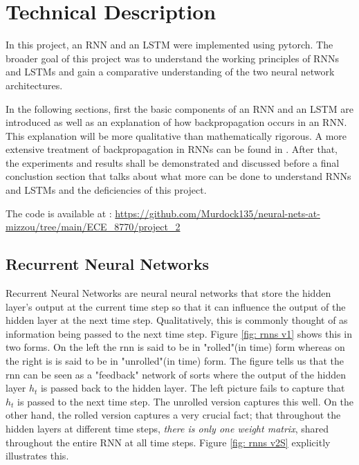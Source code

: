 \documentclass[12pt, letterpaper]{article}
\begin{document}

\tableofcontents

\section{Technical Description}

In this project, an RNN and an LSTM were implemented using pytorch.
The broader goal of this project was to understand the working principles of
RNNs and LSTMs and gain a comparative understanding of the two neural network
architectures. 

In the following sections, first the basic components of an RNN and an LSTM 
are introduced as well as an explanation of how backpropagation occurs in an 
RNN. This explanation will be more qualitative than mathematically rigorous. 
A more extensive treatment of backpropagation in RNNs can be found in \cite{zhang2023dive}. After that, the experiments and results shall be demonstrated and discussed before
a final conclustion section that talks about what more can be done to understand
RNNs and LSTMs and the deficiencies of this project.

The code is available at : \url{https://github.com/Murdock135/neural-nets-at-mizzou/tree/main/ECE_8770/project_2}

\subsection{Recurrent Neural Networks}

Recurrent Neural Networks are neural neural networks that store the 
hidden layer's output at the current time step so that it can influence
the output of the hidden layer at the next time step. Qualitatively,
this is commonly thought of as information being passed to the next time
step. Figure \ref{fig: rnns v1} shows this in two forms. On the left the 
rnn is said to be in "rolled"(in time) form whereas on the right is is said to be 
in "unrolled"(in time) form. The figure tells us that the rnn can be seen as a "feedback"
network of sorts where the output of the hidden layer $h_t$ is passed back to the hidden layer.
The left picture fails to capture that $h_t$ is passed to the next time step. The unrolled 
version captures this well. On the other hand, the rolled version captures a very crucial 
fact; that throughout the hidden layers at different time steps, \textit{there is only 
one weight matrix}, shared throughout the entire RNN at all time steps. Figure \ref{fig: rnns v2S} explicitly
illustrates this.
\end{document}
